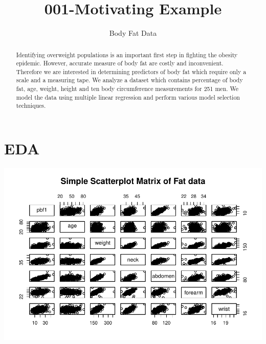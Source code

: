 \documentclass[11pt,letter]{article}\usepackage[]{graphicx}\usepackage[]{color}
\makeatletter
\def\maxwidth{ %
  \ifdim\Gin@nat@width>\linewidth
    \linewidth
  \else
    \Gin@nat@width
  \fi
}
\newenvironment{knitrout}{}{} %
\makeatother
\begin{document}
\pagestyle{fancy}

\title{001-Motivating Example}
\author{Body Fat Data}
\maketitle







\begin{abstract}
Identifying overweight populations is an important first step in fighting the obesity epidemic. However, accurate measure of body fat are costly and inconvenient. Therefore we are interested in determining predictors of body fat which require only a scale and a measuring tape. We analyze a dataset which contains percentage of body fat, age, weight, height and ten body circumference measurements for 251 men. We model the data using multiple linear regression and perform various model selection techniques.
\end{abstract}


\section{EDA}



\begin{knitrout}
\color{fgcolor}

{\centering \includegraphics[width=\maxwidth]{figure/fig-pairs-1} 

}



\end{knitrout}
\end{document}

